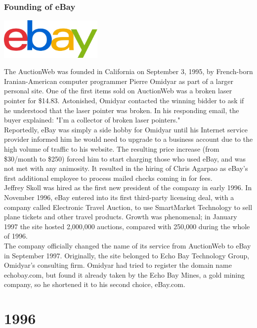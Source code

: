 \documentclass[11pt]{report}
\begin{document}
\subsection{Founding of eBay}
\vspace{2mm}\begin{center}\includegraphics[width=5cm]{./img/ebayLogo.jpg}\end{center}
The AuctionWeb was founded in California on September 3, 1995, by French-born Iranian-American computer programmer Pierre Omidyar as part of a larger personal site. One of the first items sold on AuctionWeb was a broken laser pointer for \$14.83. Astonished, Omidyar contacted the winning bidder to ask if he understood that the laser pointer was broken. In his responding email, the buyer explained: "I'm a collector of broken laser pointers."\\
\indent Reportedly, eBay was simply a side hobby for Omidyar until his Internet service provider informed him he would need to upgrade to a business account due to the high volume of traffic to his website. The resulting price increase (from \$30/month to \$250) forced him to start charging those who used eBay, and was not met with any animosity. It resulted in the hiring of Chris Agarpao as eBay's first additional employee to process mailed checks coming in for fees.\\
\indent Jeffrey Skoll was hired as the first new president of the company in early 1996. In November 1996, eBay entered into its first third-party licensing deal, with a company called Electronic Travel Auction, to use SmartMarket Technology to sell plane tickets and other travel products. Growth was phenomenal; in January 1997 the site hosted 2,000,000 auctions, compared with 250,000 during the whole of 1996.\\
\indent The company officially changed the name of its service from AuctionWeb to eBay in September 1997. Originally, the site belonged to Echo Bay Technology Group, Omidyar's consulting firm. Omidyar had tried to register the domain name echobay.com, but found it already taken by the Echo Bay Mines, a gold mining company, so he shortened it to his second choice, eBay.com.

\chapter{1996}
\end{document}
